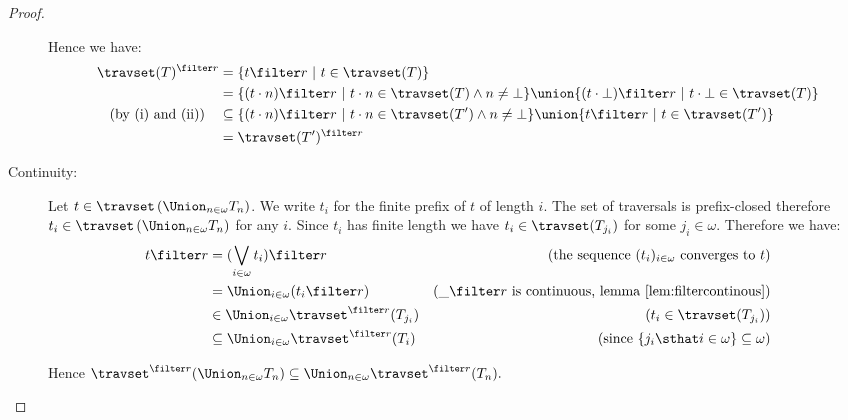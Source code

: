 \begin{proof}
\begin{description}
        Hence we have:
        \begin{align*}
        \travset(T)^{\filter r} &= \{ t \filter r \ | \ t \in \travset(T)     \} \\
        & = \{ (t\cdot n) \filter r \ | \ t\cdot n \in \travset(T) \wedge n \neq \bot \}
            \union \{ (t \cdot \bot ) \filter r \ | \ t \cdot \bot \in \travset(T)  \} \\
\mbox{(by (i) and (ii))} \quad        & \subseteq  \{ (t\cdot n)
\filter r \ | \ t\cdot n \in \travset(T') \wedge n \neq \bot
\}
            \union \{ t \filter r \ | \ t \in \travset(T')  \} \\
        & = \travset(T')^{\filter r}
        \end{align*}

        \item[Continuity:] Let $t \in \travset \left( \Union_{n\in\omega} T_n \right)$.
        We write $t_i$ for the finite prefix of $t$ of length $i$.
        The set of traversals is prefix-closed therefore $t_i \in \travset \left( \Union_{n\in\omega} T_n \right)$ for any $i$.
        Since $t_i$ has finite length we have $t_i \in \travset(T_{j_i})$ for some $j_i \in \omega$.
        Therefore we have:
        \begin{align*}
          t \filter r &= (\bigvee_{i\in\omega} t_i ) \filter r   & (\mbox{the sequence $(t_i)_{i\in\omega}$ converges to $t$}) \\
          &= \Union_{i\in\omega} ( t_i \filter r )   & (\_ \filter r \mbox{ is continuous, lemma \ref{lem:filtercontinous}}) \\
          &\in \Union_{i\in\omega} \travset^{\filter r}(T_{j_i})   & (t_i \in \travset(T_{j_i})) \\
          &\subseteq \Union_{i\in\omega} \travset^{\filter r}(T_i)   & (\mbox{since } \{ j_i \sthat i \in \omega \} \subseteq \omega)
        \end{align*}

        Hence $\travset^{\filter r} (\Union_{n\in\omega} T_n ) \subseteq \Union_{n\in\omega} \travset^{\filter r}(T_n).$

    \end{description}
\end{proof}

